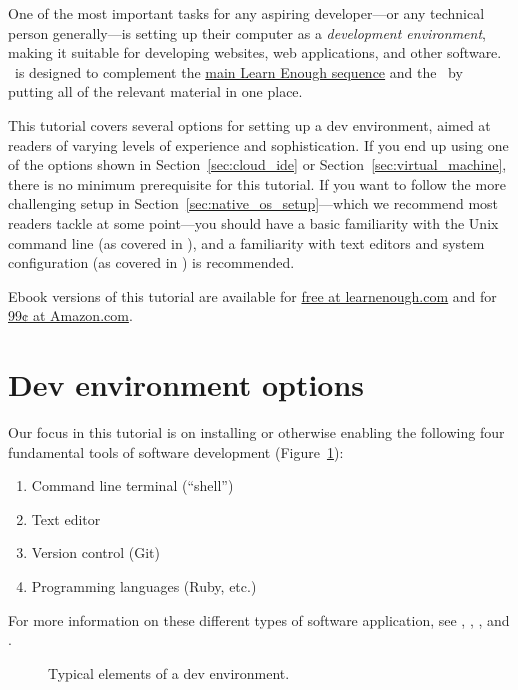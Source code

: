 One of the most important tasks for any aspiring developer---or any technical person generally---is setting up their computer as a \emph{development environment}, making it suitable for developing websites, web applications, and other software. \ledev\ is designed to complement the \href{http://www.learnenough.com/tutorials}{main Learn Enough sequence} and the \rort\ by putting all of the relevant material in one place.

This tutorial covers several options for setting up a dev environment, aimed at readers of varying levels of experience and sophistication. If you end up using one of the options shown in Section~\ref{sec:cloud_ide} or Section~\ref{sec:virtual_machine}, there is no minimum prerequisite for this tutorial. If you want to follow the more challenging setup in Section~\ref{sec:native_os_setup}---which we recommend most readers tackle at some point---you should have a basic familiarity with the Unix command line (as covered in \lecl), and a familiarity with text editors and system configuration (as covered in ) is recommended.

Ebook versions of this tutorial are available for \href{https://www.softcover.io/email-capture/28fdb94f/learn_enough_dev_environment}{free at learnenough.com} and for \href{https://www.amazon.com/Learn-Enough-Dev-Environment-Dangerous-ebook/dp/B01MTEQJ6E}{99¢ at Amazon.com}.

\section{Dev environment options} %
\label{sec:dev_environment_options}

Our focus in this tutorial is on installing or otherwise enabling the following four fundamental tools of software development (Figure~\ref{fig:dev_environment}):
\begin{enumerate}
  \item Command line terminal (``shell'')
  \item Text editor
  \item Version control (Git)
  \item Programming languages (Ruby, etc.)
\end{enumerate}
For more information on these different types of software application, see \lecl, , \leg, and \ler.

\begin{figure}
\begin{center}
\end{center}
\caption{Typical elements of a dev environment.\label{fig:dev_environment}}
\end{figure}

